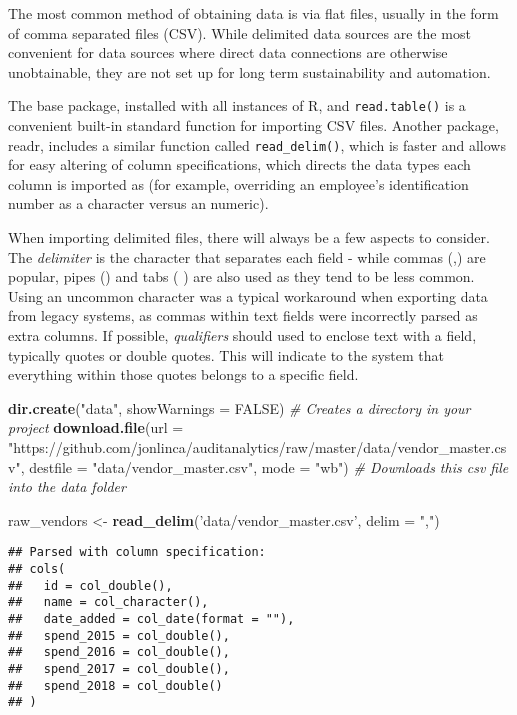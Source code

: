 \documentclass[
]{book}
\newenvironment{Shaded}{\begin{snugshade}}{\end{snugshade}}
\newcommand{\CommentTok}[1]{\textcolor[rgb]{0.56,0.35,0.01}{\textit{#1}}}
\newcommand{\DataTypeTok}[1]{\textcolor[rgb]{0.13,0.29,0.53}{#1}}
\newcommand{\KeywordTok}[1]{\textcolor[rgb]{0.13,0.29,0.53}{\textbf{#1}}}
\newcommand{\NormalTok}[1]{#1}
\newcommand{\OtherTok}[1]{\textcolor[rgb]{0.56,0.35,0.01}{#1}}
\newcommand{\StringTok}[1]{\textcolor[rgb]{0.31,0.60,0.02}{#1}}
\begin{document}
The most common method of obtaining data is via flat files, usually in the form of comma separated files (CSV). While delimited data sources are the most convenient for data sources where direct data connections are otherwise unobtainable, they are not set up for long term sustainability and automation.

The base package, installed with all instances of R, and \texttt{read.table()} is a convenient built-in standard function for importing CSV files. Another package, readr, includes a similar function called \texttt{read\_delim()}, which is faster and allows for easy altering of column specifications, which directs the data types each column is imported as (for example, overriding an employee's identification number as a character versus an numeric).

When importing delimited files, there will always be a few aspects to consider. The \emph{delimiter} is the character that separates each field - while commas (,) are popular, pipes (\textbar) and tabs ( ) are also used as they tend to be less common. Using an uncommon character was a typical workaround when exporting data from legacy systems, as commas within text fields were incorrectly parsed as extra columns. If possible, \emph{qualifiers} should used to enclose text with a field, typically quotes or double quotes. This will indicate to the system that everything within those quotes belongs to a specific field.

\begin{Shaded}
\begin{Highlighting}[]
\KeywordTok{dir.create}\NormalTok{(}\StringTok{"data"}\NormalTok{, }\DataTypeTok{showWarnings =} \OtherTok{FALSE}\NormalTok{) }\CommentTok{# Creates a directory in your project}
\KeywordTok{download.file}\NormalTok{(}\DataTypeTok{url =} \StringTok{"https://github.com/jonlinca/auditanalytics/raw/master/data/vendor_master.csv"}\NormalTok{,}
              \DataTypeTok{destfile =} \StringTok{"data/vendor_master.csv"}\NormalTok{, }\DataTypeTok{mode =} \StringTok{"wb"}\NormalTok{) }\CommentTok{# Downloads this csv file into the data folder}

\NormalTok{raw_vendors <-}\StringTok{ }\KeywordTok{read_delim}\NormalTok{(}\StringTok{'data/vendor_master.csv'}\NormalTok{, }\DataTypeTok{delim =} \StringTok{","}\NormalTok{)}
\end{Highlighting}
\end{Shaded}

\begin{verbatim}
## Parsed with column specification:
## cols(
##   id = col_double(),
##   name = col_character(),
##   date_added = col_date(format = ""),
##   spend_2015 = col_double(),
##   spend_2016 = col_double(),
##   spend_2017 = col_double(),
##   spend_2018 = col_double()
## )
\end{verbatim}
\end{document}
